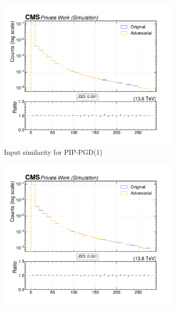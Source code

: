 \begin{figure}[htbp]
  \centering
  \begin{subfigure}[t]{0.32\textwidth}
    \includegraphics[width=\linewidth]{media/output/features/compare/combined_it_1/cmp_vtx_arr_sv_pt.pdf}
    \caption*{Input similarity for PIP-PGD(1)}
  \end{subfigure}\hfill
  \begin{subfigure}[t]{0.32\textwidth}
    \includegraphics[width=\linewidth]{media/output/features/compare/combined_it_2/cmp_vtx_arr_sv_pt.pdf}

\end{subfigure}
\end{figure}

